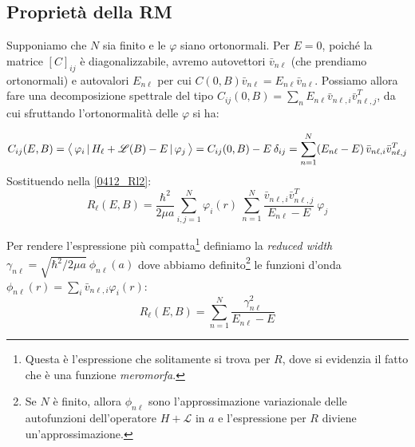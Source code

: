 \subsection{Proprietà della RM}
Supponiamo che $N$ sia finito e le $\varphi$ siano ortonormali. Per $E=0$, poiché la matrice $[C]_{ij}$ è diagonalizzabile, avremo autovettori $\bar{v}_{n\ell}$ (che prendiamo ortonormali) e autovalori $E_{n\ell}$ per cui $C(0,B)\bar{v}_{n\ell} = E_{n\ell} \bar{v}_{n\ell}$. Possiamo allora fare una decomposizione spettrale del tipo $C_{ij}(0,B) = \sum_n E_{n\ell} \bar{v}_{n\ell,i} \bar{v}^T_{n\ell,j}$, da cui sfruttando l'ortonormalità delle $\varphi$ si ha:

$$ C_{ij}(E,B) = \bigl\langle\, \varphi_i\, |\,H_\ell + \mathscr{L}(B) - E\, |\,\varphi_j\, \bigr\rangle = C_{ij}(0,B) - E\: \delta_{ij} = \sum_{n=1}^N (E_{n\ell} - E)\, \bar{v}_{n\ell,i}\bar{v}^T_{n\ell,j}$$
Sostituendo nella \eqref{0412_Rl2}:
$$R_\ell (E,B) = \frac{\hbar^2}{2\mu a} \sum_{i,j =1}^N \varphi_i(r) \: \sum_{n=1}^{N} \frac{\bar{v}_{n\ell,i}\bar{v}^T_{n\ell,j}}{E_{n\ell}-E} \: \varphi_j$$ 

\noindent Per rendere l'espressione più compatta\footnote{Questa è l'espressione che solitamente si trova per $R$, dove si evidenzia il fatto che è una funzione \textit{meromorfa}.} definiamo la \textit{reduced width} $\gamma_{n\ell} = \sqrt{\hbar^2/2\mu a} \: \phi_{n\ell}(a)$ dove abbiamo definito\footnote{Se $N$ è finito, allora $\phi_{n\ell}$ sono l'approssimazione variazionale delle autofunzioni dell'operatore $H+\mathscr{L}$ in $a$ e l'espressione per $R$ diviene un'approssimazione.} le funzioni d'onda $\phi_{n\ell}(r) = \sum_i \bar{v}_{n\ell,i}\varphi_i(r)$:
\begin{equation}\label{0412_Rl3}
R_\ell (E,B) = \sum_{n=1}^N \frac{\gamma_{n\ell}^2}{E_{n\ell}-E}	
\end{equation}

